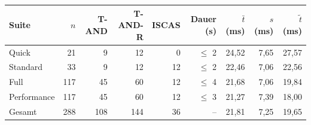 \begin{tabular}{lrrrrrrrr}
\toprule
Suite & $n$ & T-AND & T-AND-R & ISCAS & Dauer (s) & $\bar{t}$ (ms) & $s$ (ms) & $\tilde{t}$ (ms) \\
\midrule
Quick & 21 & 9 & 12 & 0 & $\leq$ 2 & 24,52 & 7,65 & 27,57 \\
Standard & 33 & 9 & 12 & 12 & $\leq$ 2 & 22,46 & 7,06 & 22,56 \\
Full & 117 & 45 & 60 & 12 & $\leq$ 4 & 21,68 & 7,06 & 19,84 \\
Performance & 117 & 45 & 60 & 12 & $\leq$ 3 & 21,27 & 7,39 & 18,00 \\
\midrule
Gesamt & 288 & 108 & 144 & 36 & -- & 21,81 & 7,25 & 19,65 \\
\bottomrule
\end{tabular}
